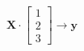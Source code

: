 \documentclass[10pt]{article}
\begin{document}
\begin{align*}\boldsymbol{X} \cdot
\begin{bmatrix}
1 \\
2 \\
3
\end{bmatrix}
\rightarrow
\boldsymbol{y}\end{align*}
\end{document}
